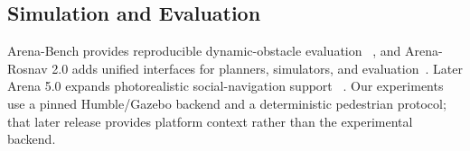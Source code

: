 \subsection{Simulation and Evaluation}
Arena-Bench provides reproducible dynamic-obstacle evaluation
~\cite{kastner2022arenabench}, and Arena-Rosnav 2.0 adds unified interfaces for
planners, simulators, and evaluation~\cite{kastner2023arena2}.  Later Arena
5.0 expands photorealistic social-navigation support
~\cite{shcherbyna2025arena5}.
Our experiments use a pinned Humble/Gazebo backend and a deterministic
pedestrian protocol; that later release provides platform context rather than
the experimental backend.
